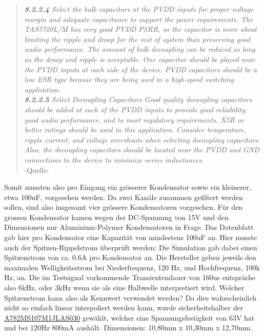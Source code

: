 \begin{quotation}
	\textit{\textbf{8.2.2.4}
	Select the bulk capacitors at the PVDD inputs for proper voltage margin and adequate capacitance to support the
	power requirements. The TAS5720L/M has very good PVDD PSRR, so the capacitor is more about limiting the
	ripple and droop for the rest of system than preserving good audio performance. The amount of bulk decoupling
	can be reduced as long as the droop and ripple is acceptable. One capacitor should be placed near the PVDD
	inputs at each side of the device. PVDD capacitors should be a low ESR type because they are being used in a
	high-speed switching application.\\
	\textbf{8.2.2.5 }
	Select Decoupling Capacitors
	Good quality decoupling capacitors should be added at each of the PVDD inputs to provide good reliability, good
	audio performance, and to meet regulatory requirements. X5R or better ratings should be used in this
	application. Consider temperature, ripple current, and voltage overshoots when selecting decoupling capacitors.
	Also, the decoupling capacitors should be located near the PVDD and GND connections to the device to
	minimize series inductances.}\\-Quelle: \cite{TAS5720L/M_datasheet}
\end{quotation}
Somit mussten also pro Eingang ein grösserer Kondensator sowie ein kleinerer, etwa 100nF, vorgesehen werden. Da zwei Kanäle zusammen gefiltert werden sollen, sind also insgesamt vier grössere Kondensatoren vorgesehen. Für den grossen Kondensator kamen wegen der DC-Spannung von 15V und den Dimensionen nur Aluminium-Polymer Kondensatoren in Frage. Das Datenblatt gab hier pro Kondensator eine Kapazität von mindestens 100uF an. Hier musste auch der Spitzen-Rippelstrom überprüft werden: Die Simulation gab dabei einen Spitzenstrom von ca. 0.6A pro Kondensator an. Die Hersteller geben jeweils den maximalen Welligkeitsstrom bei Niederfrequenz, 120 Hz, und Hochfrequenz, 100k Hz, an. Die im Testsignal vorkommende Transientendauer von 160us entspräche also 6kHz, oder 3kHz wenn sie als eine Halbwelle interpretiert wird. Welcher Spitzenstrom kann also als Kennwert verwendet werden? Da dies wahrscheinlich nicht so einfach linear interpoliert werden kann, wurde sicherheitshalber der \href{https://www.digikey.ch/de/products/detail/kemet/A782MS107M1JLAS030/21544807}{A782MS107M1JLAS030} gewählt, welcher eine Spannungsfestigkeit von 63V hat und bei 120Hz 800mA aushält. Dimensionen: 10,80mm x 10,30mm x 12,70mm.
